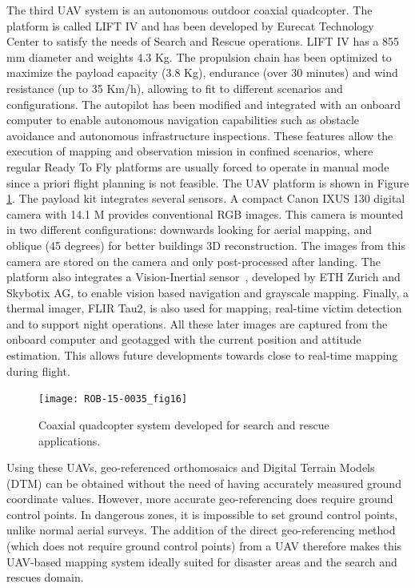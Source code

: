 \documentclass{article}
\begin{document}
The third UAV system is an autonomous outdoor coaxial quadcopter.
The platform is called LIFT IV and has been developed by Eurecat Technology Center to satisfy the needs of Search and Rescue operations.
LIFT IV has a 855 mm diameter and weights 4.3 Kg.
The propulsion chain has been optimized to maximize the payload capacity (3.8 Kg), endurance (over 30 minutes) and wind resistance (up to 35 Km/h), allowing to fit to different scenarios and configurations.
The autopilot has been modified and integrated with an onboard computer to enable autonomous navigation capabilities such as obstacle avoidance and autonomous infrastructure inspections.
These features allow the execution of mapping and observation mission in confined scenarios, where regular Ready To Fly platforms are usually forced to operate in manual mode since a priori flight planning is not feasible.
The UAV platform is shown in Figure \ref{fig:UAV2}.
The payload kit integrates several sensors.
A compact Canon IXUS 130 digital camera with 14.1 M provides conventional RGB images.
This camera is mounted in two different configurations: downwards looking for aerial mapping, and oblique (45 degrees) for better buildings 3D reconstruction.
The images from this camera are stored on the camera and only post-processed after landing.
The platform also integrates a Vision-Inertial sensor~\cite{nikolic2014synchronized}, developed by ETH Zurich and Skybotix AG, to enable vision based navigation and grayscale mapping.
Finally, a thermal imager, FLIR Tau2, is also used for mapping, real-time victim detection and to support night operations.
All these later images are captured from the onboard computer and geotagged with the current position and attitude estimation.
This allows future developments towards close to real-time mapping during flight.
\begin{figure}[h]
\centering
\texttt{[image: ROB-15-0035\_fig16]}
\caption{Coaxial quadcopter system developed for search and rescue applications.}
\label{fig:UAV2}
\end{figure}

Using these UAVs, geo-referenced orthomosaics and Digital Terrain Models (DTM) can be obtained without the need of having accurately measured ground coordinate values.
However, more accurate geo-referencing does require ground control points.
In dangerous zones, it is impossible to set ground control points, unlike normal aerial surveys.
The addition of the direct geo-referencing method (which does not require ground control points) from a UAV therefore makes this UAV-based mapping system ideally suited for disaster areas and the search and rescues domain.
\end{document}
